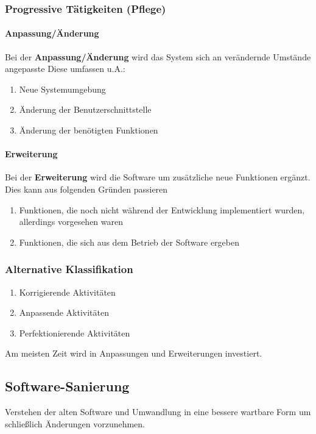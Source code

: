 \documentclass[a4paper]{article}
\theoremstyle{break}
\begin{document}
\subsubsection{Progressive Tätigkeiten (Pflege)}
\paragraph{Anpassung/Änderung}
Bei der \textbf{Anpassung/Änderung} wird das System sich an verändernde Umstände angepasste\newline
Diese umfassen u.A.:
\begin{enumerate}
	\item Neue Systemumgebung
	\item Änderung der Benutzerschnittstelle
	\item Änderung der benötigten Funktionen
\end{enumerate}
\paragraph{Erweiterung}
Bei der \textbf{Erweiterung} wird die Software um zusätzliche neue Funktionen ergänzt.\newline
Dies kann aus folgenden Gründen passieren
\begin{enumerate}
	\item Funktionen, die noch nicht während der Entwicklung implementiert wurden, allerdings vorgesehen waren
	\item Funktionen, die sich aus dem Betrieb der Software ergeben
\end{enumerate} 
\subsubsection{Alternative Klassifikation}
  \begin{enumerate}
  \item Korrigierende Aktivitäten
  \item Anpassende Aktivitäten
  \item Perfektionierende Aktivitäten
  \end{enumerate}
  \noindent Am meisten Zeit wird in Anpassungen und Erweiterungen investiert.


\subsection{Software-Sanierung}
Verstehen der alten Software und Umwandlung in eine bessere wartbare Form um schlie\ss{}lich Änderungen vorzunehmen.
\end{document}
